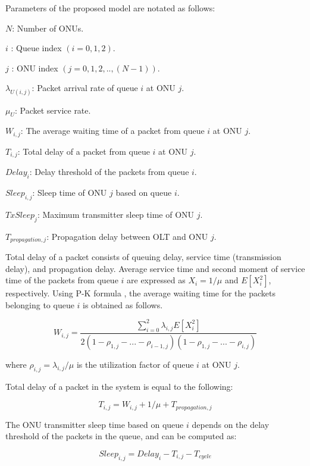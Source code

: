 \documentclass[11pt,english,12pt,onecolumn, draftcls]{IEEEtran}
\theoremstyle{plain}
\theoremstyle{definition}
\begin{document}
Parameters of the proposed model are notated as follows:

$N$: Number of ONUs.

$i$ : Queue index $(i=0,1,2)$.

$j$ : ONU index $(j=0,1,2,..,(N-1))$.

$\lambda_{U(i,j)}$: Packet arrival rate of queue $i$ at ONU $j$.

$\mu_U$: Packet service rate.

$W_{i,j}$: The average waiting time of a packet from queue $i$ at ONU $j$.

$T_{i,j}$: Total delay of a packet from queue $i$ at ONU $j$.

$Delay_i$: Delay threshold of the packets from queue $i$.

$Sleep_{i,j}$: Sleep time of ONU $j$ based on queue $i$.

$TxSleep_j$: Maximum transmitter sleep time of ONU $j$.

$T_{propagation,j}$: Propagation delay between OLT and ONU $j$.




Total delay of a packet consists of queuing delay, service time (transmission delay), and propagation delay. Average service time and second moment of service time of the packets from queue $i$ are expressed as $X_i=1/\mu$ and $E[X_i^2]$, respectively. Using P-K formula \cite{bertsekas1992data}, the average waiting time for the packets belonging to queue $i$ is obtained as follows.

\begin{equation}
W_{i,j} = \frac{\sum_{i=0}^{2} \lambda_{i,j}E[X_i^2]}{2(1-\rho_{1,j}-...-\rho_{i-1,j})(1-\rho_{1,j}-...-\rho_{i,j})}
\end{equation}

where $\rho_{i,j}=\lambda_{i,j}/\mu$ is the utilization factor of queue $i$ at ONU $j$.

Total delay of a packet in the system is equal to the following:

\begin{equation}
T_{i,j} = W_{i,j} + 1/\mu + T_{propagation,j}
\end{equation}

The ONU transmitter sleep time based on queue $i$ depends on the delay threshold of the packets in the queue, and can be computed as:

\begin{equation}
Sleep_{i,j} = Delay_i - T_{i,j} - T_{cycle}
\end{equation}
\end{document}
